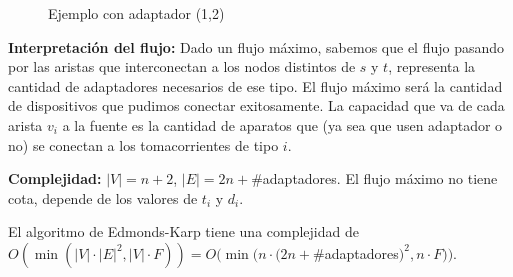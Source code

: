 \documentclass{article}
\begin{document}
\begin{figure}[H]

\begin{center}
\end{center}
\caption{Ejemplo con adaptador (1,2)}
\end{figure}


\textbf{Interpretación del flujo:} Dado un flujo máximo, sabemos que el flujo pasando por las aristas que interconectan a los nodos distintos de $s$ y $t$, representa la cantidad de adaptadores necesarios de ese tipo. El flujo máximo será la cantidad de dispositivos que pudimos conectar exitosamente. La capacidad que va de cada arista $v_i$ a la fuente es la cantidad de aparatos que (ya sea que usen adaptador o no) se conectan a los tomacorrientes de tipo $i$.

\textbf{Complejidad:} $|V| = n + 2$, $|E| = 2n + \#$adaptadores. El flujo máximo no tiene cota, depende de los valores de $t_i$ y $d_i$.

El algoritmo de Edmonds-Karp tiene una complejidad de $O(\min(|V| \cdot |E|^2, |V| \cdot F)) = O(\min(n \cdot (2n + \#$adaptadores$)^2, n \cdot F))$.
\end{document}
